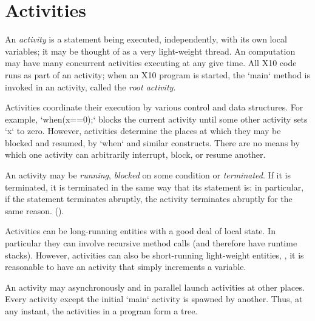 \chapter{Activities}\label{XtenActivities}


An {\em activity} is a statement being executed, independently, with its own
local variables; it may be thought of as a very light-weight thread. An
\Xten{} computation may have many concurrent {activities} executing at any
give time.  All X10 code runs as part of an activity; when an X10 program is
started, the \xcd`main` method is invoked in an activity, called the {\em root
activity}.


Activities coordinate their execution by various control and data structures.
For example, 
\xcd`when(x==0);` blocks the current activity until some other activity
sets \xcd`x` to zero.  However, activities determine the places at which they
may be blocked and resumed, by \xcd`when` and similar constructs.  There are
no means by which one activity can arbitrarily interrupt, block, or resume
another.


An activity may be {\em running}, {\em blocked} on some condition or {\em
terminated}. If it is terminated, it is terminated in the same way that its
statement is: in particular, if the statement terminates abruptly, the
activity terminates abruptly for the same reason.
().

Activities can be long-running entities with a good deal of local state.  In
particular they can involve recursive method calls (and therefore have runtime
stacks).  However, activities can also be short-running light-weight entities,
\eg, it is reasonable to have an activity that simply increments a variable.

An activity may asynchronously and in parallel launch activities at
other places.  Every activity except the initial \xcd`main` activity is spawned
by another.  Thus, at any instant, the activities in a program form a tree.

